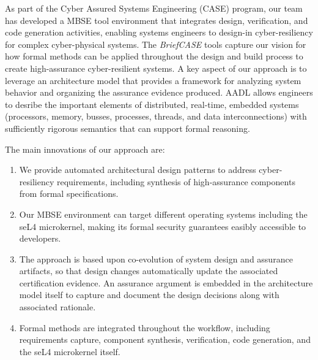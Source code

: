 As part of the Cyber Assured Systems Engineering (CASE) program,
our team has developed a MBSE tool environment that integrates design, verification,
and code generation activities, enabling systems engineers to design-in cyber-resiliency
for complex cyber-physical systems. The {\em BriefCASE} tools capture our 
vision for how formal methods can be applied throughout the design and build process 
to create high-assurance cyber-resilient systems.  
A key aspect of our approach is to leverage an
architecture model that provides a framework for analyzing
system behavior and organizing the assurance evidence produced.  
AADL allows engineers to desribe the important elements of distributed,
real-time, embedded systems (processors, memory, busses, processes, 
threads, and data interconnections) with sufficiently rigorous semantics
that can support formal reasoning.  

The main innovations of our approach are:

\begin{enumerate}

\item We provide automated architectural design patterns to address cyber-resiliency requirements, 
including synthesis of high-assurance components from formal specifications.

\item Our MBSE environment can target different operating systems including the seL4 microkernel, 
making its formal security guarantees easibly accessible to developers. 

\item The approach is based upon co-evolution of system design and assurance artifacts, so that
design changes automatically update the associated certification evidence. An assurance argument
is embedded in the architecture model itself to capture and document the design decisions 
along with associated rationale.

\item Formal methods are integrated throughout the workflow, including requirements capture,
component synthesis, verification, code generation, and the seL4 microkernel itself. 

\end{enumerate}




